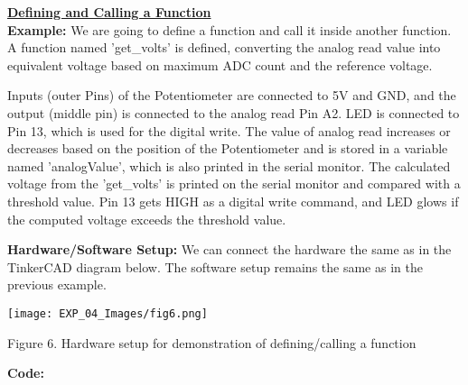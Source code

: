 \documentclass[12pt,a4paper]{article}
\begin{document}
\setlength{\parindent}{0eM}
\begin{justify}
\textbf{\underline{Defining and Calling a Function}}\\[6pt]
\textbf{Example:} We are going to define a function and call it inside another function. A function named 'get\_volts' is defined, converting the analog read value into equivalent voltage based on maximum ADC count and the reference voltage.\par

\noindent Inputs (outer Pins) of the Potentiometer are connected to 5V and GND, and the output (middle pin) is connected to the analog read Pin A2. LED is connected to Pin 13, which is used for the digital write. The value of analog read increases or decreases based on the position of the Potentiometer and is stored in a variable named 'analogValue', which is also printed in the serial monitor. The calculated voltage from the 'get\_volts' is printed on the serial monitor and compared with a threshold value. Pin 13 gets HIGH as a digital write command, and LED glows if the computed voltage exceeds the threshold value.\par

\noindent \textbf{Hardware/Software Setup:} We can connect the hardware the same as in the TinkerCAD diagram below. The software setup remains the same as in the previous example.

\begin{center} 
\texttt{[image: EXP\_04\_Images/fig6.png]}
\end{center}
\vspace{-7mm}
\begin{center} {Figure 6. Hardware setup for demonstration of defining/calling a function}\end{center}
\end{justify}


\vspace{10mm}
\hspace{1.5cm}\textbf{\large Code:}\\[6pt]
\setlength{\parindent}{8eM}
\end{document}

